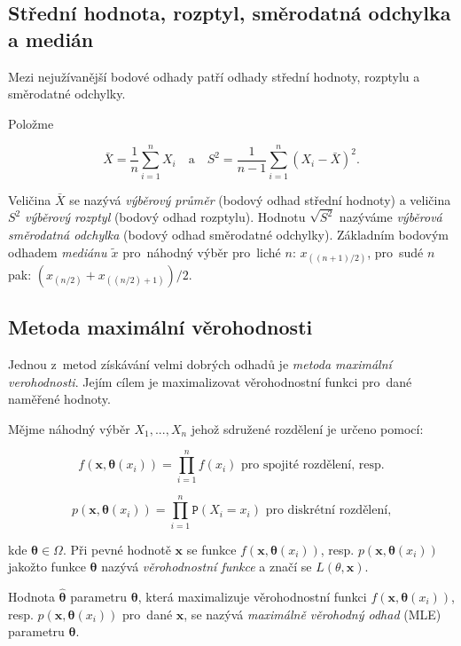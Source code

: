 \documentclass[thesis=B,czech]{FITthesis}[2012/06/26]
\begin{document}
\subsection{Střední hodnota, rozptyl, směrodatná odchylka a medián}

Mezi nejužívanější bodové odhady patří odhady střední hodnoty, rozptylu a směrodatné odchylky.

Položme

$$\bar{X}=\frac{1}{n}\sum_{i=1}^{n}X_{i} \quad \text{a} \quad S^{2}=\frac{1}{n-1}\sum_{i=1}^{n}(X_{i}-\bar{X})^2.$$

Veličina $\bar{X}$ se nazývá \textit{výběrový průměr} (bodový odhad střední hodnoty) a veličina $S^{2}$ \textit{výběrový rozptyl} (bodový odhad rozptylu). Hodnotu $\sqrt{S^{2}}$ nazýváme \textit{výběrová směrodatná odchylka} (bodový odhad směrodatné odchylky). Základním bodovým odhadem \textit{mediánu $\tilde{x}$} pro~náhodný výběr pro~liché $n$: $x_{((n+1)/2)}$, pro~sudé $n$ pak: $(x_{(n/2)}+x_{((n/2)+1)})/2$.


\subsection{Metoda maximální věrohodnosti}
Jednou z~metod získávání velmi dobrých odhadů je \textit{metoda maximální verohodnosti}. Jejím cílem je maximalizovat věrohodnostní funkci pro~dané naměřené hodnoty. 

Mějme náhodný výběr $X_{1},...,X_{n}$ jehož sdružené rozdělení je určeno pomocí: 

$$f(\boldsymbol{x},\boldsymbol{\theta}(x_i)) = \prod_{i=1}^{n}f(x_{i})
\mbox{ pro~spojité rozdělení, resp.}$$

$$p(\boldsymbol{x},\boldsymbol{\theta}(x_i)) = \prod_{i=1}^{n}\mathtt{P}(X_{i}=x_{i})
\mbox{ pro~diskrétní rozdělení,}$$

\noindent kde $\boldsymbol{\theta}\in\Omega$. Při pevné hodnotě $\boldsymbol{x}$ se funkce $f(\boldsymbol{x},\boldsymbol{\theta}(x_i))$, resp. $p(\boldsymbol{x},\boldsymbol{\theta}(x_i))$ jakožto funkce $\boldsymbol{\theta}$ nazývá \textit{věrohodnostní funkce} a značí se $L(\theta,\boldsymbol{x})$.

\begin{sloppypar}
Hodnota $\hat{\boldsymbol{\theta}}$ parametru $\boldsymbol{\theta}$, která maximalizuje věrohodnostní funkci $f(\boldsymbol{x},\boldsymbol{\theta}(x_i))$, resp. $p(\boldsymbol{x},\boldsymbol{\theta}(x_i))$ pro~dané $\boldsymbol{x}$, se nazývá \textit{maximálně věrohodný odhad} (MLE) parametru $\boldsymbol{\theta}$.\end{sloppypar}
\end{document}
